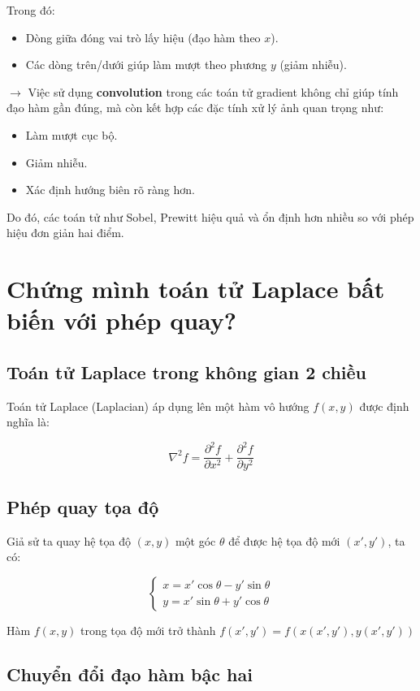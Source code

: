 \documentclass[12pt]{article}
\begin{document}
	Trong đó:
	\begin{itemize}
	\item Dòng giữa đóng vai trò lấy hiệu (đạo hàm theo $x$).
	\item Các dòng trên/dưới giúp làm mượt theo phương $y$ (giảm nhiễu).
	\end{itemize}
	
	$\rightarrow$ Việc sử dụng \textbf{convolution} trong các toán tử gradient không chỉ giúp tính đạo hàm gần đúng, mà còn kết hợp các đặc tính xử lý ảnh quan trọng như:
	\begin{itemize}
	\item Làm mượt cục bộ.
	\item Giảm nhiễu.
	\item Xác định hướng biên rõ ràng hơn.
	\end{itemize}
	
	Do đó, các toán tử như Sobel, Prewitt hiệu quả và ổn định hơn nhiều so với phép hiệu đơn giản hai điểm.
	
	\section{Chứng mình toán tử Laplace bất biến với phép quay?}
	
	\subsection{Toán tử Laplace trong không gian 2 chiều}
	
	Toán tử Laplace (Laplacian) áp dụng lên một hàm vô hướng $f(x, y)$ được định nghĩa là:
	
	\[
	\nabla^2 f = \frac{\partial^2 f}{\partial x^2} + \frac{\partial^2 f}{\partial y^2}
	\]
	
	\subsection{Phép quay tọa độ}
	
	Giả sử ta quay hệ tọa độ $(x, y)$ một góc $\theta$ để được hệ tọa độ mới $(x', y')$, ta có:
	
	\[
	\begin{cases}
	x = x' \cos\theta - y' \sin\theta \\
	y = x' \sin\theta + y' \cos\theta
	\end{cases}
	\]
	
	Hàm $f(x, y)$ trong tọa độ mới trở thành $f(x', y') = f(x(x', y'), y(x', y'))$
	
	\subsection{Chuyển đổi đạo hàm bậc hai}
	
\end{document}
